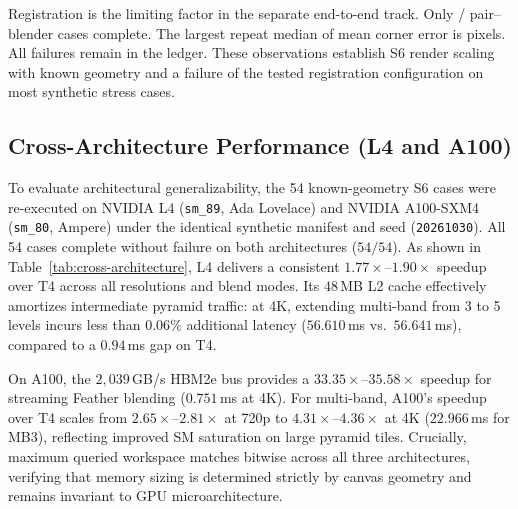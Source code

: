 Registration is the limiting factor in the separate end-to-end track. Only
\ChEndSuccess{}/\ChEndTotal{} pair--blender cases complete. The largest
repeat median of mean corner error is \ChGeometryError{} pixels. All failures
remain in the ledger. These observations establish S6 render scaling with
known geometry and a failure of the tested registration configuration on
most synthetic stress cases.

\subsection{Cross-Architecture Performance (L4 and A100)}
\label{sec:cross-arch}

To evaluate architectural generalizability, the 54 known-geometry S6 cases
were re-executed on NVIDIA L4 (\texttt{sm\_89}, Ada Lovelace) and NVIDIA
A100-SXM4 (\texttt{sm\_80}, Ampere) under the identical synthetic manifest and
seed (\texttt{20261030}).
All 54 cases complete without failure on both architectures ($54/54$).
As shown in Table~\ref{tab:cross-architecture}, L4 delivers a consistent
$1.77\times$--$1.90\times$ speedup over T4 across all resolutions and blend
modes.
Its $48$\,MB L2 cache effectively amortizes intermediate pyramid traffic: at
4K, extending multi-band from 3 to 5 levels incurs less than $0.06\%$
additional latency ($56.610$\,ms vs.\ $56.641$\,ms), compared to a $0.94$\,ms
gap on T4.

On A100, the $2{,}039$\,GB/s HBM2e bus provides a $33.35\times$--$35.58\times$
speedup for streaming Feather blending ($0.751$\,ms at 4K).
For multi-band, A100's speedup over T4 scales from $2.65\times$--$2.81\times$ at
720p to $4.31\times$--$4.36\times$ at 4K ($22.966$\,ms for MB3), reflecting
improved SM saturation on large pyramid tiles.
Crucially, maximum queried workspace matches bitwise across all three
architectures, verifying that memory sizing is determined strictly by canvas
geometry and remains invariant to GPU microarchitecture.
